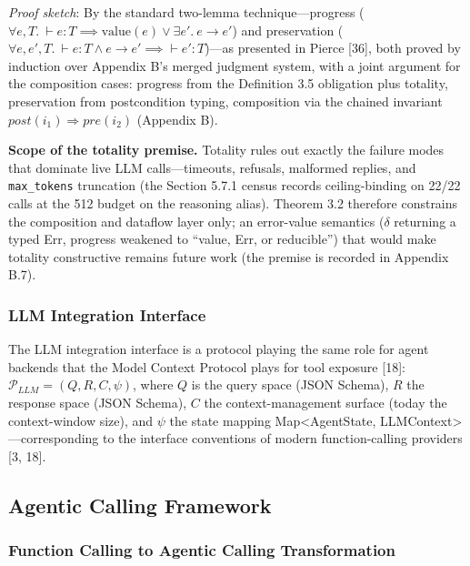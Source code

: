\documentclass[
  sigconf,
  anonymous]{acmart}
\begin{document}
\emph{Proof sketch}: By the standard two-lemma technique---progress
(\(\forall e, T.\ \vdash e : T \implies \mathrm{value}(e) \lor \exists e'.\ e \to e'\))
and preservation
(\(\forall e, e', T.\ \vdash e : T \land e \to e' \implies \vdash e' : T\))---as
presented in Pierce {[}36{]}, both proved by induction over Appendix B's
merged judgment system, with a joint argument for the composition cases:
progress from the Definition 3.5 obligation plus totality, preservation
from postcondition typing, composition via the chained invariant
\(post(i_1) \Rightarrow pre(i_2)\) (Appendix B).

\textbf{Scope of the totality premise.} Totality rules out exactly the
failure modes that dominate live LLM calls---timeouts, refusals,
malformed replies, and \texttt{max\_tokens} truncation (the Section
5.7.1 census records ceiling-binding on 22/22 calls at the 512 budget on
the reasoning alias). Theorem 3.2 therefore constrains the composition
and dataflow layer only; an error-value semantics (\(\delta\) returning
a typed Err, progress weakened to ``value, Err, or reducible'') that
would make totality constructive remains future work (the premise is
recorded in Appendix B.7).

\subsubsection{LLM Integration
Interface}\label{llm-integration-interface}

The LLM integration interface is a protocol playing the same role for
agent backends that the Model Context Protocol plays for tool exposure
{[}18{]}: \(\mathcal{P}_{LLM} = (Q, R, C, \psi)\), where \(Q\) is the
query space (JSON Schema), \(R\) the response space (JSON Schema), \(C\)
the context-management surface (today the context-window size), and
\(\psi\) the state mapping Map\textless AgentState,
LLMContext\textgreater---corresponding to the interface conventions of
modern function-calling providers {[}3, 18{]}.

\subsection{Agentic Calling Framework}\label{agentic-calling-framework}

\subsubsection{Function Calling to Agentic Calling
Transformation}\label{function-calling-to-agentic-calling-transformation}
\end{document}
